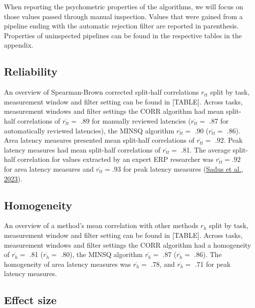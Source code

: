 \documentclass[
  man]{apa7}
\begin{document}
When reporting the psychometric properties of the algorithms, we will focus on those values passed through manual inspection. Values that were gained from a pipeline ending with the automatic rejection filter are reported in parenthesis. Properties of uninspected pipelines can be found in the respective tables in the appendix.

\hypertarget{reliability}{%
\subsection{Reliability}\label{reliability}}

An overview of Spearman-Brown corrected split-half correlations \(r_{tt}\) split by task, measurement window and filter setting can be found in {[}TABLE{]}. Across tasks, measurement windows and filter settings the CORR algorithm had mean split-half correlations of \(\overline{r_{tt}} =\) .89 for manually reviewed latencies (\(\overline{r_{tt}} =\) .87 for automatically reviewed latencies), the MINSQ algorithm \(\overline{r_{tt}} =\) .90 (\(\overline{r_{tt}} =\) .86). Area latency measures presented mean split-half correlations of \(\overline{r_{tt}} =\) .92. Peak latency measures had mean split-half correlations of \(\overline{r_{tt}} =\) .81. The average split-half correlation for values extracted by an expert ERP researcher was \(\overline{r_{tt}} = .92\) for area latency measures and \(\overline{r_{tt}} = .93\) for peak latency measures (\protect\hyperlink{ref-sadus2023multiverse}{Sadus et al., 2023}).

\hypertarget{homogeneity}{%
\subsection{Homogeneity}\label{homogeneity}}

An overview of a method's mean correlation with other methods \(r_h\) split by task, measurement window and filter setting can be found in {[}TABLE{]}. Across tasks, measurement windows and filter settings the CORR algorithm had a homogeneity of \(\overline{r_{h}} =\) .81 (\(\overline{r_{h}} =\) .80), the MINSQ algorithm \(\overline{r_{h}} =\) .87 (\(\overline{r_{h}} =\) .86). The homogeneity of area latency measures was \(\overline{r_{h}} =\) .78, and \(\overline{r_{h}} =\) .71 for peak latency measures.

\hypertarget{effect-size}{%
\subsection{Effect size}\label{effect-size}}
\end{document}
